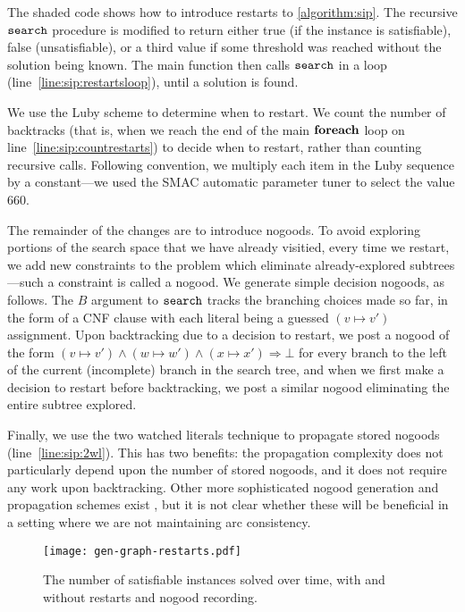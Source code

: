 \documentclass[letterpaper]{article} %
\newcommand{\siplineref}[1]{line~\ref{line:sip:#1}}
\begin{document}
The shaded code shows how to introduce restarts to \cref{algorithm:sip}. The recursive
$\FuncSty{search}$ procedure is modified to return either true (if the instance is satisfiable),
false (unsatisfiable), or a third value if some threshold was reached without the solution being
known.  The main function then calls $\FuncSty{search}$ in a loop (\siplineref{restartsloop}), until
a solution is found.

We use the Luby scheme \cite{DBLP:journals/ipl/LubySZ93} to determine when to restart. We count the
number of backtracks (that is, when we reach the end of the main $\KwSty{foreach}$ loop on
\siplineref{countrestarts}) to decide when to restart, rather than counting recursive calls.
Following convention, we multiply each item in the Luby sequence by a constant---we
used the SMAC automatic parameter tuner \cite{DBLP:conf/lion/HutterHL11} to select the value 660.

The remainder of the changes are to introduce nogoods. To avoid exploring portions of the search
space that we have already visitied, every time we restart, we add new constraints to the problem
which eliminate already-explored subtrees---such a constraint is called a nogood. We generate simple
decision nogoods, as follows. The $B$ argument to $\FuncSty{search}$ tracks the branching choices
made so far, in the form of a CNF clause with each literal being a guessed $(v \mapsto v')$
assignment. Upon backtracking due to a decision to restart, we post a nogood of the form $(v \mapsto
v') \wedge (w \mapsto w') \wedge (x \mapsto x') \Rightarrow \bot$ for every branch to the left of
the current (incomplete) branch in the search tree, and when we first make a decision to restart
before backtracking, we post a similar nogood eliminating the entire subtree explored.

Finally, we use the two watched literals technique \cite{DBLP:conf/dac/MoskewiczMZZM01} to
propagate stored nogoods (\siplineref{2wl}). This has two benefits: the propagation complexity does
not particularly depend upon the number of stored nogoods, and it does not require any work upon
backtracking.  Other more sophisticated nogood generation and propagation schemes exist
\cite{DBLP:conf/aaai/LeeSZ16,DBLP:conf/cp/GlorianBLLM17}, but it is not clear whether these will be
beneficial in a setting where we are not maintaining arc consistency.

\begin{figure}[tb]
    \centering
    \texttt{[image: gen-graph-restarts.pdf]}

    \caption{The number of satisfiable instances solved over time, with and without
    restarts and nogood recording.}
    \label{figure:restarts}
\end{figure}
\end{document}
